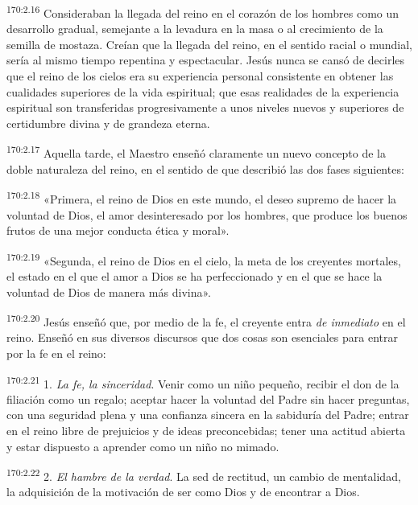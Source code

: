 \par 
\textsuperscript{170:2.16} Consideraban la llegada del reino en el corazón de los hombres como un desarrollo gradual, semejante a la levadura en la masa o al crecimiento de la semilla de mostaza. Creían que la llegada del reino, en el sentido racial o mundial, sería al mismo tiempo repentina y espectacular. Jesús nunca se cansó de decirles que el reino de los cielos era su experiencia personal consistente en obtener las cualidades superiores de la vida espiritual; que esas realidades de la experiencia espiritual son transferidas progresivamente a unos niveles nuevos y superiores de certidumbre divina y de grandeza eterna.

\par 
\textsuperscript{170:2.17} Aquella tarde, el Maestro enseñó claramente un nuevo concepto de la doble naturaleza del reino, en el sentido de que describió las dos fases siguientes:

\par 
\textsuperscript{170:2.18} «Primera, el reino de Dios en este mundo, el deseo supremo de hacer la voluntad de Dios, el amor desinteresado por los hombres, que produce los buenos frutos de una mejor conducta ética y moral».

\par 
\textsuperscript{170:2.19} «Segunda, el reino de Dios en el cielo, la meta de los creyentes mortales, el estado en el que el amor a Dios se ha perfeccionado y en el que se hace la voluntad de Dios de manera más divina».

\par 
\textsuperscript{170:2.20} Jesús enseñó que, por medio de la fe, el creyente entra \textit{de inmediato} en el reino. Enseñó en sus diversos discursos que dos cosas son esenciales para entrar por la fe en el reino:

\par 
\textsuperscript{170:2.21} 1. \textit{La fe, la sinceridad}. Venir como un niño pequeño, recibir el don de la filiación como un regalo; aceptar hacer la voluntad del Padre sin hacer preguntas, con una seguridad plena y una confianza sincera en la sabiduría del Padre; entrar en el reino libre de prejuicios y de ideas preconcebidas; tener una actitud abierta y estar dispuesto a aprender como un niño no mimado.

\par 
\textsuperscript{170:2.22} 2. \textit{El hambre de la verdad}. La sed de rectitud, un cambio de mentalidad, la adquisición de la motivación de ser como Dios y de encontrar a Dios.

